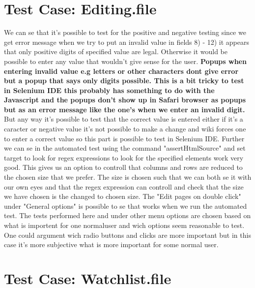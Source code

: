 \documentclass[a4paper,10pt]{article}
\begin{document}
\section*{Test Case: Editing.file}

We can se that it’s possible to test for the positive and negative testing since we get error message when we
try to put an invalid value in fields 8) - 12) it appears that only positive digits of specified value are legal. Otherwise
it would be possible to enter any value that wouldn’t give sense for the user. \textbf{\color{red}Popups when entering invalid value e.g letters
or other characters dont give error but a popup that says only digits possible. This is a bit tricky to test in Selenium IDE this
probably has something to do with the Javascript and the popups don't show up in Safari browser as popups but as an error message
like the one's when we enter an invalid digit.} But any way it's possible to test that the correct value is entered either if 
it's a caracter or negative value it's not possible to make a change and wiki forces one to enter a correct value so this part
is possible to test in Selenium IDE. Further we can se in the automated test using the command "assertHtmlSource" and set target
to look for regex expressions to look for the specified elements work very good. This gives us an option to controll that 
columns and rows are reduced to the chosen size that we prefer. The size is chosen such that we can both se it with our own
eyes and that the regex expression can controll and check that the size we have chosen is the changed to chosen size.
The "Edit pages on double click" under "General options" is possible to se that works when we run the automated test.
The tests performed here and under other menu options are chosen based on what is importent for one normaluser and
wich options seem reasonable to test. One could argument wich radio buttons and clicks are more important but in this case
it's more subjective what is more important for some normal user.



\section*{Test Case: Watchlist.file}
\end{document}

